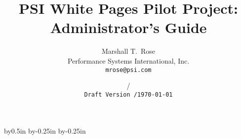


\def\theguide/{{\em The Guide\/}}
\def\thebook/{{\em The Handbook\/}}
\def\volfive/{{\em Volume Five\/}}
\def\camayoc/{{\em Camayoc\/}}


\makeatletter
\let\titlep@ge=\titlepage
\def\titlepage{\titlep@ge \def\thefootnote{\fnsymbol{footnote}}}

\let\endtitlep@ge=\endtitlepage
\let\endtitlepage=\relax

\let\m@ketitle=\maketitle
\def\maketitle{\m@ketitle\let\titlepage=\relax\let\endtitlepage=\endtitlep@ge}
\makeatother

\advance\textwidth by0.5in
\advance\oddsidemargin by-0.25in
\advance\evensidemargin by-0.25in

\newdimen\foosidemargin
\let\foosidemargin=\oddsidemargin
\let\oddsidemargin=\evensidemargin
\let\evensidemargin=\foosidemargin

\makeindex




\title{PSI White Pages Pilot Project:\\ Administrator's Guide}
\author{Marshall T.~Rose\\ Performance Systems International, Inc.\\
	\tt mrose@psi.com}
\date{\ifdraft \versiondate/\\ \tt Draft Version \versiontag/\else \today\fi}
\maketitle

